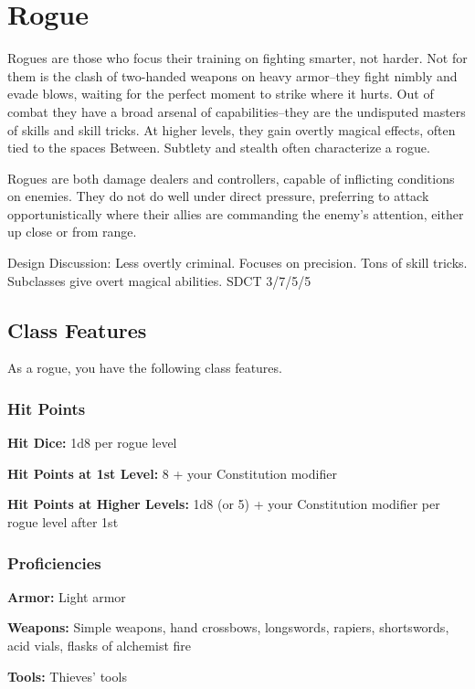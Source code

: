 \section{Rogue}\label{class:rogue}

Rogues are those who focus their training on fighting smarter, not harder. Not for them is the clash of two-handed weapons on heavy armor--they fight nimbly and evade blows, waiting for the perfect moment to strike where it hurts. Out of combat they have a broad arsenal of capabilities--they are the undisputed masters of skills and skill tricks. At higher levels, they gain overtly magical effects, often tied to the spaces Between. Subtlety and stealth often characterize a rogue.

Rogues are both damage dealers and controllers, capable of inflicting conditions on enemies. They do not do well under direct pressure, preferring to attack opportunistically where their allies are commanding the enemy's attention, either up close or from range.

Design Discussion: Less overtly criminal. Focuses on precision. Tons of skill tricks. Subclasses give overt magical abilities. SDCT 3/7/5/5

\subsection{Class Features}

As a rogue, you have the following class features.

\subsubsection{Hit Points}

\textbf{Hit Dice:} 1d8 per rogue level

\textbf{Hit Points at 1st Level:} 8 + your Constitution modifier

\textbf{Hit Points at Higher Levels:} 1d8 (or 5) + your Constitution modifier per rogue level after 1st

\subsubsection{Proficiencies}

\textbf{Armor:} Light armor

\textbf{Weapons:} Simple weapons, hand crossbows, longswords, rapiers, shortswords, acid vials, flasks of alchemist fire

\textbf{Tools:} Thieves' tools

